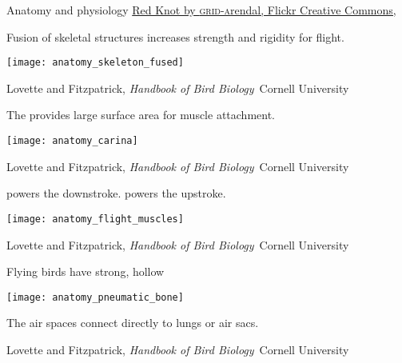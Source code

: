 \documentclass[t]{beamer}
\begin{document}

{
\begin{frame}[b,plain]{Anatomy and physiology}
	\tiny \href{https://www.flickr.com/photos/148768555@N05/31605481882}{Red Knot by \textsc{grid-a}rendal, Flickr Creative Commons, }
\end{frame}
}

\begin{frame}[t,plain]{Fusion of skeletal structures increases strength and rigidity for flight.}

	\vspace{-0.5\baselineskip}
	\centering 
	\texttt{[image: anatomy\_skeleton\_fused]}
	
	\vfilll
	
	\tiny \hfill Lovette and Fitzpatrick, \textit{Handbook of Bird Biology} \textcopyright\,Cornell University
\end{frame}

\begin{frame}[t,plain]{The  provides large surface area for muscle attachment.}

	\vspace{-0.5\baselineskip}
	\centering 
	\texttt{[image: anatomy\_carina]}
	
	\vfilll
	
	\tiny \hfill Lovette and Fitzpatrick, \textit{Handbook of Bird Biology} \textcopyright\,Cornell University
\end{frame}

\begin{frame}[t,plain]{ powers the downstroke.  powers the upstroke.}

	\vspace{-0.5\baselineskip}
	\centering 
	\texttt{[image: anatomy\_flight\_muscles]}
	
	\vfilll
	
	\tiny \hfill Lovette and Fitzpatrick, \textit{Handbook of Bird Biology} \textcopyright\,Cornell University
\end{frame}



\begin{frame}[t,plain]{Flying birds have strong, hollow  }

	\texttt{[image: anatomy\_pneumatic\_bone]}
	
	\hangpara The air spaces connect directly to lungs or air sacs.
	
	\vfilll
	
	\tiny \hfill Lovette and Fitzpatrick, \textit{Handbook of Bird Biology} \textcopyright\,Cornell University
\end{frame}
\end{document}
